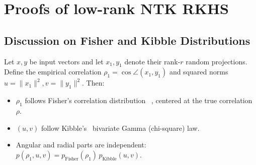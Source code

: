 





\section{Proofs of low-rank NTK RKHS}




\subsection{Discussion on Fisher and Kibble Distributions}
\label{appendix:fisher-kibble}

\begin{lemma}
\label{lem:fisher-kibble}
Let \(x,y\) be input vectors and let \(x_1,y_1\) denote their rank-\(r\) random projections. Define the empirical correlation \( \rho_1 = \cos\angle(x_1,y_1) \) and squared norms \( u=\|x_1\|^2, v=\|y_1\|^2 \). Then:
\begin{itemize}
    \item \( \rho_1 \) follows Fisher's correlation distribution~\cite{fisher1915probable} \cite{hotelling1953new}, centered at the true correlation \( \rho \).
    \item \( (u,v) \) follow Kibble's~\cite{kibble1941two} bivariate Gamma (chi-square) law.
    \item Angular and radial parts are independent: \( p(\rho_1,u,v) = p_{\text{Fisher}}(\rho_1)\,p_{\text{Kibble}}(u,v) \).
\end{itemize}
\end{lemma}

